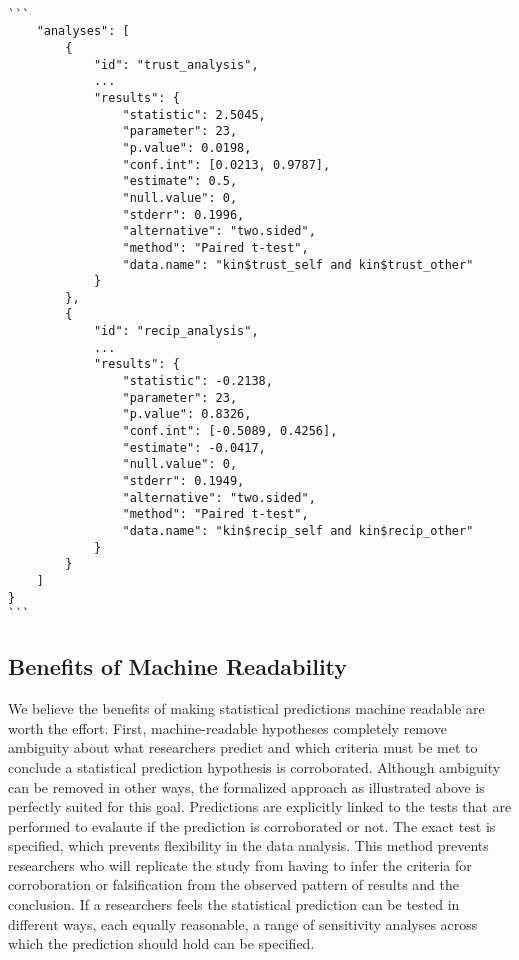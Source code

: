 \documentclass[english,doc,floatsintext]{apa6}
\begin{document}
\begin{tcolorbox}[colback=black!5!white,colframe=white!5!black,title=Box 7. Results of data analysis.]
\begin{verbatim}

```
    "analyses": [
        {
            "id": "trust_analysis",
            ...
            "results": {
                "statistic": 2.5045,
                "parameter": 23,
                "p.value": 0.0198,
                "conf.int": [0.0213, 0.9787],
                "estimate": 0.5,
                "null.value": 0,
                "stderr": 0.1996,
                "alternative": "two.sided",
                "method": "Paired t-test",
                "data.name": "kin$trust_self and kin$trust_other"
            }
        },
        {
            "id": "recip_analysis",
            ...
            "results": {
                "statistic": -0.2138,
                "parameter": 23,
                "p.value": 0.8326,
                "conf.int": [-0.5089, 0.4256],
                "estimate": -0.0417,
                "null.value": 0,
                "stderr": 0.1949,
                "alternative": "two.sided",
                "method": "Paired t-test",
                "data.name": "kin$recip_self and kin$recip_other"
            }
        }
    ]
}
```

\end{verbatim}
\end{tcolorbox}

\hypertarget{benefits-of-machine-readability}{%
\subsection{Benefits of Machine Readability}\label{benefits-of-machine-readability}}

We believe the benefits of making statistical predictions machine readable are worth the effort. First, machine-readable hypotheses completely remove ambiguity about what researchers predict and which criteria must be met to conclude a statistical prediction hypothesis is corroborated. Although ambiguity can be removed in other ways, the formalized approach as illustrated above is perfectly suited for this goal. Predictions are explicitly linked to the tests that are performed to evalaute if the prediction is corroborated or not. The exact test is specified, which prevents flexibility in the data analysis. This method prevents researchers who will replicate the study from having to infer the criteria for corroboration or falsification from the observed pattern of results and the conclusion. If a researchers feels the statistical prediction can be tested in different ways, each equally reasonable, a range of sensitivity analyses across which the prediction should hold can be specified.
\end{document}
